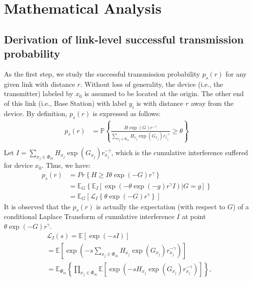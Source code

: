 \section{Mathematical Analysis}
\subsection{Derivation of link-level successful transmission probability}
As the first step, we study the successful transmission probability $p_s(r)$ for any given link with distance $r$.
Without loss of generality, the device (i.e., the transmitter) labeled by $x_0$ is assumed to be located at the origin. The other end of this link (i.e., Base Station) with label $y_i$ is with distance $r$ away from the device. By definition, $p_s(r)$ is expressed as follows:
\begin{align}
p_{s} \left( r\right)
& =\mathbb{P}\left\lbrace \frac{H \exp(G) r^{-\gamma}}{\sum_{x_j \in \Phi_{m}} H_{x_j} \exp(G_{x_j}) r_{x_j}^{-\gamma}}  \geq \theta \right\rbrace \nonumber\\
\end{align}
Let $I=\sum_{x_j \in \Phi_{m}} H_{x_j} \exp(G_{x_j}) r_{x_j}^{-\gamma}$, which is the cumulative interference suffered for device $x_0$. Thus, we have:
\begin{align}
\label{eq:def_ps}
p_{s}\left( r \right)  &= Pr \left\lbrace H  \geq I \theta\exp(-G)r ^{\gamma}  \right\rbrace  \nonumber\\
&=\mathbb{E}_{G}\left\lbrace  \mathbb{E}_{I} \left[ \exp(-\theta \exp(-g) r^{\gamma}  I ) \vert G = g\right]\right\rbrace   \nonumber\\
&= \mathbb{E}_{G} \left[ \mathcal{L}_{I}\left\lbrace \theta \exp(-G) r^{\gamma}\right\rbrace \right] 
\end{align}
It is observed that the $p_s\left( r \right)$ is actually the expectation (with respect to $G$) of a conditional Laplace Transform of cumulative interference $I$ at point $\theta \exp(-G)  r^{\gamma}$.
\begin{align}
\label{eq:interferece-laplace-transform}
&\mathcal{L}_{I}\left( s \right)  = \mathbb{E}\left[ \exp(-sI)\right] \nonumber\\
&= \mathbb{E}\left[ \exp(-s\sum_{x_j \in \Phi_m} H_{x_j} \exp(G_{x_j})  r_{x_j}^{-\gamma})\right] \nonumber \\
&= \mathbb{E}_{\Phi_m} \left\lbrace \prod_{x_j\in \Phi_m} \mathbb{E}\left[\exp(-sH_{x_j} \exp(G_{x_j})  r_{x_j}^{-\gamma})\right] \right\rbrace ,
\end{align}
